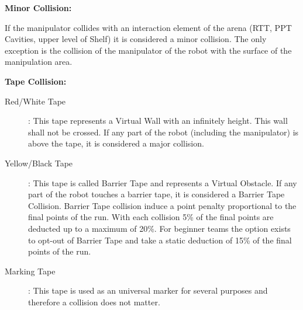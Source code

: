 \textbf{Minor Collision:}

If the manipulator collides with an interaction element of the arena (RTT, PPT Cavities, upper level
of Shelf) it is considered a minor collision. The only exception is the collision of the manipulator
of the robot with the surface of the manipulation area.

\textbf{Tape Collision:}

\begin{description}
  \item[Red/White Tape]: This tape represents a Virtual Wall with an infinitely height. This wall shall not be crossed. If any part of the robot (including the manipulator) is above the tape, it is considered a major collision. 
  \item[Yellow/Black Tape]: This tape is called Barrier Tape and represents a Virtual Obstacle. If any part of the robot
  touches a barrier tape, it is considered a Barrier Tape Collision. Barrier Tape collision induce a point penalty
  proportional to the final points of the run. With each collision 5\% of the final points are deducted up to a maximum
  of 20\%. For beginner teams the option exists to opt-out of Barrier Tape and take a static deduction of 15\% of the
  final points of the run.
  \item[Marking Tape]: This tape is used as an universal marker for several purposes and therefore a collision does not matter. 
\end{description}

